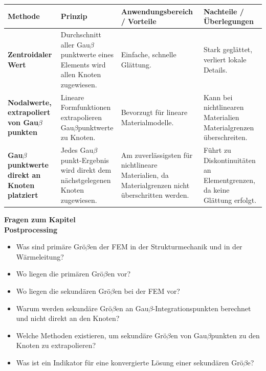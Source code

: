 \bigskip\noindent
\begin{tabular}{p{}p{}p{}p{}}
\toprule
Methode & Prinzip & Anwendungsbereich / Vorteile & Nachteile / Überlegungen \\
\hline
\textbf{Zentroidaler Wert} & Durchschnitt aller Gau$\beta$punktwerte eines Elements wird allen Knoten zugewiesen. & Einfache, schnelle Glättung. & Stark geglättet, verliert lokale Details. \\
\textbf{Nodalwerte, extrapoliert von Gau$\beta$punkten} & Lineare Formfunktionen extrapolieren Gau$\beta$punktwerte zu Knoten. & Bevorzugt für lineare Materialmodelle. & Kann bei nichtlinearen Materialien Materialgrenzen überschreiten. \\
\textbf{Gau$\beta$punktwerte direkt an Knoten platziert} & Jedes Gau$\beta$punkt-Ergebnis wird direkt dem nächstgelegenen Knoten zugewiesen. & Am zuverlässigsten für nichtlineare Materialien, da Materialgrenzen nicht überschritten werden. & Führt zu Diskontinuitäten an Elementgrenzen, da keine Glättung erfolgt. \\
\bottomrule
\end{tabular}

\bigskip\begin{framed}
\textbf{Fragen zum Kapitel}\\
\textbf{Postprocessing}

\begin{itemize}
\item Was sind primäre Grö$\beta$en der FEM in der Strukturmechanik und in der Wärmeleitung?
\item Wo liegen die primären Grö$\beta$en vor?
\item Wo liegen die sekundären Grö$\beta$en bei der FEM vor?
\item Warum werden sekundäre Grö$\beta$en an Gau$\beta$-Integrationspunkten berechnet und nicht direkt an den Knoten?
\item Welche Methoden existieren, um sekundäre Grö$\beta$en von Gau$\beta$punkten zu den Knoten zu extrapolieren?
\item Was ist ein Indikator für eine konvergierte Lösung einer sekundären Grö$\beta$e?
\end{itemize}
\end{framed}